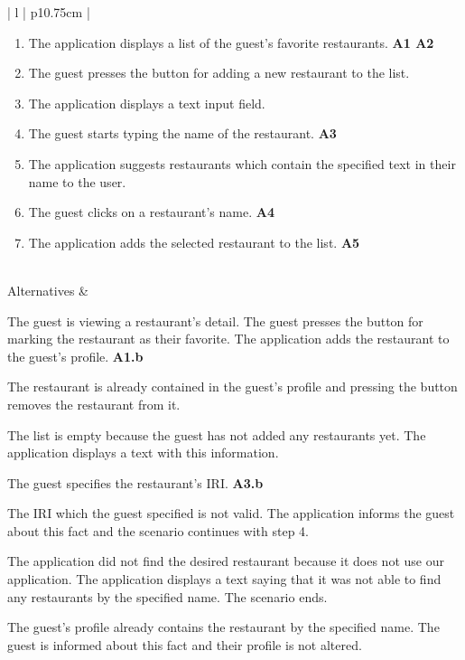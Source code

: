 \begin{center}
\begin{tabular}{| l | p{10.75cm} | }
\begin{minipage}[t]{\linewidth}
\begin{enumerate}[leftmargin=*,nosep,before=\vspace{-0.575\baselineskip},after=\strut]
        \item The application displays a list of the guest's favorite restaurants. \textbf{A1 A2}  
        \item The guest presses the button for adding a new restaurant to the list.
        \item The application displays a text input field.
        \item The guest starts typing the name of the restaurant. \textbf{A3}  
        \item The application suggests restaurants which contain the specified text in their name to the user. 
        \item The guest clicks on a restaurant's name. \textbf{A4}
        \item The application adds the selected restaurant to the list. \textbf{A5}
      \end{enumerate}
    \end{minipage}
    \\
    \hline
    Alternatives &
    \begin{minipage}[t]{\linewidth}
      \begin{description}[nosep,after=\strut]
        \item [A1:] The guest is viewing a restaurant's detail. The guest presses the button for marking the restaurant as their favorite. The application adds the restaurant to the guest's profile. \textbf{A1.b}
        \item [A1.b:] The restaurant is already contained in the guest's profile and pressing the button removes the restaurant from it.
        \item [A2:] The list is empty because the guest has not added any restaurants yet. The application displays a text with this information.
        \item [A3:] The guest specifies the restaurant's IRI. \textbf{A3.b}   
        \item [A3.b:] The IRI which the guest specified is not valid. The application informs the guest about this fact and the scenario continues with step 4.
        \item [A4:] The application did not find the desired restaurant because it does not use our application. The application displays a text saying that it was not able to find any restaurants by the specified name. The scenario ends.
        \item [A5:] The guest's profile already contains the restaurant by the specified name. The guest is informed about this fact and their profile is not altered.
      \end{description}
    \end{minipage}
    \\
    \hline
  \end{tabular}
  \newline
\end{center}

\newpage